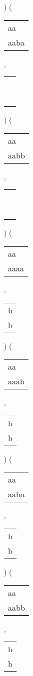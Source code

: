 ) 
 ( 
\begin{tabular}{|l|} \hline
aa\ \  \\
aaba \\
\hline
\end{tabular} 
 , 
\begin{tabular}{|l|} \hline
\ \\ \ \\ \hline
\end{tabular} 
) 
 ( 
\begin{tabular}{|l|} \hline
aa\ \  \\
aabb \\
\hline
\end{tabular} 
 , 
\begin{tabular}{|l|} \hline
\ \\ \ \\ \hline
\end{tabular} 
) 
 ( 
\begin{tabular}{|l|} \hline
aa\ \  \\
aaaa \\
\hline
\end{tabular} 
 , 
\begin{tabular}{|l|} \hline
b \\
b \\
\hline
\end{tabular} 
) 
 ( 
\begin{tabular}{|l|} \hline
aa\ \  \\
aaab \\
\hline
\end{tabular} 
 , 
\begin{tabular}{|l|} \hline
b \\
b \\
\hline
\end{tabular} 
) 
 ( 
\begin{tabular}{|l|} \hline
aa\ \  \\
aaba \\
\hline
\end{tabular} 
 , 
\begin{tabular}{|l|} \hline
b \\
b \\
\hline
\end{tabular} 
) 
 ( 
\begin{tabular}{|l|} \hline
aa\ \  \\
aabb \\
\hline
\end{tabular} 
 , 
\begin{tabular}{|l|} \hline
b \\
b \\
\hline
\end{tabular} 
